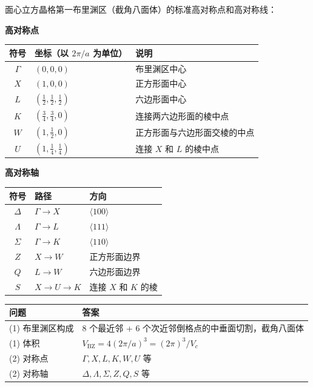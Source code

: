 \begin{derivationbox}[对称点与对称轴]
面心立方晶格第一布里渊区（截角八面体）的标准高对称点和高对称线：

\begin{center}
\textbf{高对称点}
\begin{tabular}{cll}
\toprule
\textbf{符号} & \textbf{坐标}（以 $2\pi/a$ 为单位） & \textbf{说明} \\
\midrule
$\Gamma$ & $(0,0,0)$ & 布里渊区中心 \\
$X$ & $(1,0,0)$ & 正方形面中心 \\
$L$ & $(\frac12,\frac12,\frac12)$ & 六边形面中心 \\
$K$ & $(\frac34,\frac34,0)$ & 连接两六边形面的棱中点 \\
$W$ & $(1,\frac12,0)$ & 正方形面与六边形面交棱的中点 \\
$U$ & $(1,\frac14,\frac14)$ & 连接 $X$ 和 $L$ 的棱中点 \\
\bottomrule
\end{tabular}
\end{center}

\begin{center}
\textbf{高对称轴}
\begin{tabular}{cll}
\toprule
\textbf{符号} & \textbf{路径} & \textbf{方向} \\
\midrule
$\Delta$ & $\Gamma\to X$ & $\langle100\rangle$ \\
$\Lambda$ & $\Gamma\to L$ & $\langle111\rangle$ \\
$\Sigma$ & $\Gamma\to K$ & $\langle110\rangle$ \\
$Z$ & $X\to W$ & 正方形面边界 \\
$Q$ & $L\to W$ & 六边形面边界 \\
$S$ & $X\to U\to K$ & 连接 $X$ 和 $K$ 的棱 \\
\bottomrule
\end{tabular}
\end{center}
\end{derivationbox}

\begin{formulabox}[答案汇总]
\begin{center}
\begin{tabular}{ll}
\toprule
\textbf{问题} & \textbf{答案} \\
\midrule
(1) 布里渊区构成 & 8 个最近邻 + 6 个次近邻倒格点的中垂面切割，截角八面体 \\
(1) 体积 & $V_{\text{BZ}} = 4(2\pi/a)^3 = (2\pi)^3/V_c$ \\
(2) 对称点 & $\Gamma, X, L, K, W, U$ 等 \\
(2) 对称轴 & $\Delta, \Lambda, \Sigma, Z, Q, S$ 等 \\
\bottomrule
\end{tabular}
\end{center}
\end{formulabox}

